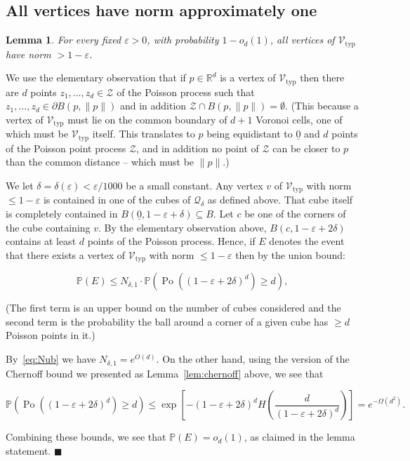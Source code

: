 \documentclass[11pt]{article}%
\newenvironment{proof}{\vspace{1ex}\noindent{\bf Proof.}}{\hspace*{\fill}$\blacksquare$\vspace{1ex}}
\newtheorem{lemma} [theorem] {Lemma}%
\newcommand{\Qcal}[0]{\ensuremath{{\mathcal Q}}}
\newcommand{\Vcal}[0]{\ensuremath{{\mathcal V}}}
\newcommand{\Zcal}[0]{\ensuremath{{\mathcal Z}}}
\newcommand{\eR}[0]{\ensuremath{ \mathbb R}}
\newcommand{\norm}[1]{\ensuremath{\|#1\|}}
\newcommand{\Pee}[0]{\ensuremath{{\mathbb P}}}
\newcommand{\eps}{\varepsilon}
\newcommand{\orig}{\underline{0}}
\DeclareMathOperator{\Po}{Po}
\newcommand{\Vtyp}[0]{\Vcal_{\text{typ}}}
\begin{document}
\subsection{All vertices have norm approximately one}



\begin{lemma}\label{lem:vertlb}
For every fixed $\eps>0$, with probability $1-o_d(1)$, all vertices of $\Vtyp$ have norm $>1-\eps$.
\end{lemma}

\begin{proof}
We use the elementary observation that if $p \in \eR^d$ is a vertex of $\Vtyp$ then 
 there are $d$ points $z_1,\dots,z_d \in \Zcal$ of the Poisson process such that 
 $z_1,\dots,z_d \in \partial B(p, \norm{p})$ and in addition $\Zcal \cap B(p, \norm{p}) = \emptyset$.
(This because a vertex of $\Vtyp$ must lie on the common boundary of $d+1$ Voronoi cells, one of which must be $\Vtyp$
itself. This translates to $p$ being  equidistant to $\orig$ and $d$ points of the Poisson point process $\Zcal$, 
and in addition no point of $\Zcal$ can be closer to $p$ than the common distance -- which must be $\norm{p}$.)

We let $\delta=\delta(\eps) < \eps/1000$ be a small constant.
Any vertex $v$ of $\Vtyp$ with norm $\leq 1-\eps$ is contained in one of the cubes of $\Qcal_\delta$ as defined above.
That cube itself is completely contained in 
$B(\orig,1-\eps+\delta)\subseteq B$. Let $c$ be one of the corners of the cube containing $v$.
By the elementary observation above, $B(c,1-\eps+2\delta)$ contains at least $d$ points of the Poisson process.
Hence, if $E$ denotes the event that there exists a vertex of $\Vtyp$ with norm $\leq 1-\eps$ then by the union bound: 

$$ \Pee( E ) \leq N_{\delta,1} \cdot \Pee\left( \Po( (1-\eps+2\delta)^d ) \geq d \right), $$

\noindent
(The first term is an upper bound on the number of cubes considered and the second term is the probability 
the ball around a corner of a given cube has $\geq d$ Poisson points in it.)

By~\eqref{eq:Nub} we have $N_{\delta,1} = e^{O(d)}$.
On the other hand, using the version of the Chernoff bound we presented as Lemma~\ref{lem:chernoff} above, 
we see that

$$ \Pee\left( \Po( (1-\eps+2\delta)^d ) \geq d \right) \leq 
\exp\left[ - (1-\eps+2\delta)^d H\left( \frac{d}{(1-\eps+2\delta)^d}\right) \right]
= e^{-\Omega( d^2 )}. $$

\noindent
Combining these bounds, we see that $\Pee(E) = o_d(1)$, as claimed in the lemma statement.
\end{proof}
\end{document}
